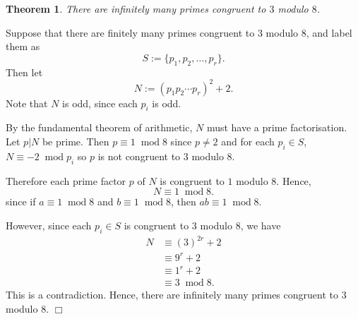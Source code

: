 \documentclass[10pt]{article}
\newtheorem{theorem}{Theorem}
\newenvironment{proof}[1][Proof]{\begin{trivlist}
\item[\hskip \labelsep {\bfseries #1}]}{\end{trivlist}}
\newcommand{\modulo}[1]{\;\operatorname{mod} #1}
\begin{document}
\begin{theorem}
    There are infinitely many primes congruent to $3$ modulo $8$.
\end{theorem}
\begin{proof}
    Suppose that there are finitely many primes congruent to $3$ modulo $8$, and label
    them as
    \begin{equation*}
        S := \{p_1,p_2,\ldots,p_r\}.
    \end{equation*}
    Then let
    \begin{equation*}
        N := (p_1p_2\cdots p_r)^2+2.
    \end{equation*}
    Note that $N$ is odd, since each $p_i$ is odd.
    
    By the fundamental theorem of arithmetic, $N$ must have a prime factorisation. Let
    $p|N$ be prime. Then $p\equiv 1\modulo{8}$ since $p\neq 2$ and for each
    $p_i\in S$, $N\equiv -2\modulo{p_i}$ so $p$ is not congruent to $3$ modulo $8$.
    
    Therefore each prime factor $p$ of $N$ is congruent to $1$ modulo $8$. Hence,
    \begin{equation*}
        N\equiv 1\modulo{8}.
    \end{equation*}
    since if $a\equiv 1\modulo{8}$ and $b\equiv 1\modulo{8}$, then $ab\equiv 1\modulo{8}$.
    
    However, since each $p_i\in S$ is congruent to $3$ modulo $8$, we have
    \begin{align*}
        N &\equiv (3)^{2r}+2\\
        &\equiv 9^r+2\\
        &\equiv 1^r+2\\
        &\equiv 3\modulo{8}.
    \end{align*}
    This is a contradiction. Hence, there are infinitely many primes congruent to $3$
    modulo $8$. $\Box$
\end{proof}
\end{document}
